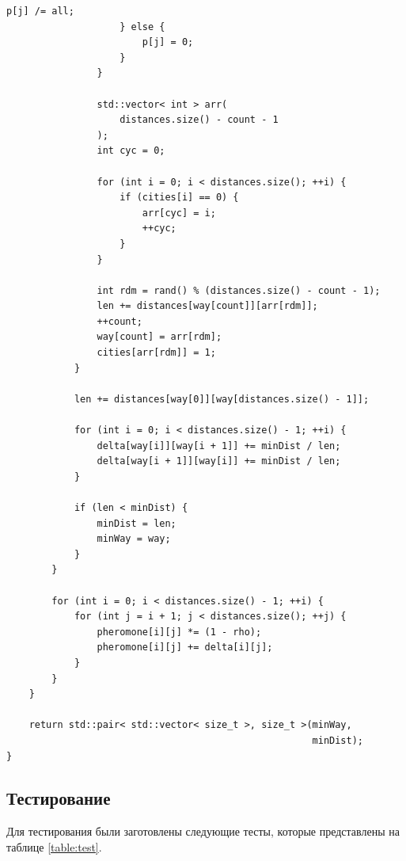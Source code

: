 \documentclass[a4paper,12pt]{article}
\begin{document}
\begin{lstlisting}[caption=Муравьиный алгоритм,label=lst:ant]
                        p[j] /= all;
                    } else {
                        p[j] = 0;
                    }
                }

                std::vector< int > arr(
                    distances.size() - count - 1
                );
                int cyc = 0;

                for (int i = 0; i < distances.size(); ++i) {
                    if (cities[i] == 0) {
                        arr[cyc] = i;
                        ++cyc;
                    }
                }

                int rdm = rand() % (distances.size() - count - 1);
                len += distances[way[count]][arr[rdm]];
                ++count;
                way[count] = arr[rdm];
                cities[arr[rdm]] = 1;
            }

            len += distances[way[0]][way[distances.size() - 1]];

            for (int i = 0; i < distances.size() - 1; ++i) {
                delta[way[i]][way[i + 1]] += minDist / len;
                delta[way[i + 1]][way[i]] += minDist / len;
            }

            if (len < minDist) {
                minDist = len;
                minWay = way;
            }
        }

        for (int i = 0; i < distances.size() - 1; ++i) {
            for (int j = i + 1; j < distances.size(); ++j) {
                pheromone[i][j] *= (1 - rho);
                pheromone[i][j] += delta[i][j];
            }
        }
    }

    return std::pair< std::vector< size_t >, size_t >(minWay,
                                                      minDist);
}
\end{lstlisting}

\subsection{Тестирование}

Для тестирования были заготовлены следующие тесты, которые представлены
на таблице \ref{table:test}.
\end{document}
